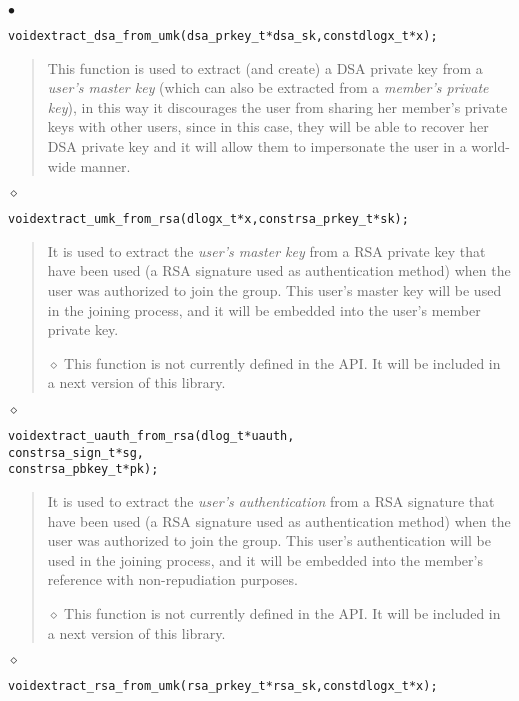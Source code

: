 \documentclass[a4paper]{article}
\newenvironment{api}%
{\noindent$\bullet$\hfill\begin{minipage}[t]{0.97\linewidth}\footnotesize\begin{alltt}}%
{\end{alltt}\end{minipage}}%
\newenvironment{apix}%
{\noindent$\diamond$\hfill\begin{minipage}[t]{0.97\linewidth}\footnotesize\begin{alltt}}%
{\end{alltt}\end{minipage}}%
\begin{document}
\begin{api}
void extract_dsa_from_umk(dsa_prkey_t* dsa_sk, const dlogx_t* x);
\end{api}
\begin{quote}\footnotesize
This function is used to extract (and create) a DSA private key from a
\emph{user's master key} (which can also be extracted from a
\emph{member's private key}), in this way it discourages the user from
sharing her member's private keys with other users, since in this
case, they will be able to recover her DSA private key and it will
allow them to impersonate the user in a world-wide manner.
\end{quote}
\begin{apix}
void extract_umk_from_rsa(dlogx_t* x, const rsa_prkey_t* sk);
\end{apix}
\begin{quote}\footnotesize
It is used to extract the \emph{user's master key} from a RSA private
key that have been used (a RSA signature used as authentication
method) when the user was authorized to join the group. This user's
master key will be used in the joining process, and it will be
embedded into the user's member private key.

$\diamond$ This function is not currently defined in the API. It will
be included in a next version of this library.
\end{quote}
\begin{apix}
void extract_uauth_from_rsa(dlog_t* uauth,
                           const rsa_sign_t* sg,
                           const rsa_pbkey_t* pk);
\end{apix}
\begin{quote}\footnotesize
It is used to extract the \emph{user's authentication} from a RSA
signature that have been used (a RSA signature used as
authentication method) when the user was authorized to join the
group. This user's authentication will be used in the joining process,
and it will be embedded into the member's reference with
non-repudiation purposes.

$\diamond$ This function is not currently defined in the API. It will
be included in a next version of this library.
\end{quote}
\begin{apix}
void extract_rsa_from_umk(rsa_prkey_t* rsa_sk, const dlogx_t* x);
\end{apix}
\end{document}
